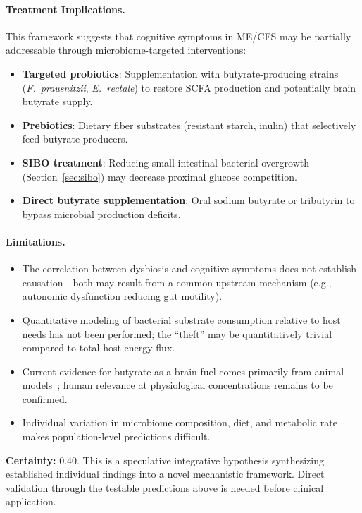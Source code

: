 \begin{speculation}
\paragraph{Treatment Implications.}
This framework suggests that cognitive symptoms in ME/CFS may be partially addressable through microbiome-targeted interventions:
\begin{itemize}
    \item \textbf{Targeted probiotics}: Supplementation with butyrate-producing strains (\textit{F.\ prausnitzii}, \textit{E.\ rectale}) to restore SCFA production and potentially brain butyrate supply.
    \item \textbf{Prebiotics}: Dietary fiber substrates (resistant starch, inulin) that selectively feed butyrate producers.
    \item \textbf{SIBO treatment}: Reducing small intestinal bacterial overgrowth (Section~\ref{sec:sibo}) may decrease proximal glucose competition.
    \item \textbf{Direct butyrate supplementation}: Oral sodium butyrate or tributyrin to bypass microbial production deficits.
\end{itemize}

\paragraph{Limitations.}
\begin{itemize}
    \item The correlation between dysbiosis and cognitive symptoms does not establish causation---both may result from a common upstream mechanism (e.g., autonomic dysfunction reducing gut motility).
    \item Quantitative modeling of bacterial substrate consumption relative to host needs has not been performed; the ``theft'' may be quantitatively trivial compared to total host energy flux.
    \item Current evidence for butyrate as a brain fuel comes primarily from animal models~\cite{Ameen2024butyrate}; human relevance at physiological concentrations remains to be confirmed.
    \item Individual variation in microbiome composition, diet, and metabolic rate makes population-level predictions difficult.
\end{itemize}

\textbf{Certainty:} 0.40. This is a speculative integrative hypothesis synthesizing established individual findings into a novel mechanistic framework. Direct validation through the testable predictions above is needed before clinical application.
\end{speculation}

